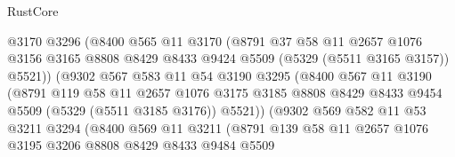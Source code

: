 \begin{lexlean}{RustCore}
\begin{coremodule}
                          @3170
                          @3296
                          (@8400
                            @565
                            @11
                            @3170
                            (@8791
                              @37
                              @58
                              @11
                              @2657
                              @1076
                              @3156
                              @3165
                              @8808
                              @8429
                              @8433
                              @9424
                              @5509
                              (@5329 (@5511 @3165 @3157))
                              @5521))
                          (@9302
                            @567
                            @583
                            @11
                            @54
                            @3190
                            @3295
                            (@8400
                              @567
                              @11
                              @3190
                              (@8791
                                @119
                                @58
                                @11
                                @2657
                                @1076
                                @3175
                                @3185
                                @8808
                                @8429
                                @8433
                                @9454
                                @5509
                                (@5329 (@5511 @3185 @3176))
                                @5521))
                            (@9302
                              @569
                              @582
                              @11
                              @53
                              @3211
                              @3294
                              (@8400
                                @569
                                @11
                                @3211
                                (@8791
                                  @139
                                  @58
                                  @11
                                  @2657
                                  @1076
                                  @3195
                                  @3206
                                  @8808
                                  @8429
                                  @8433
                                  @9484
                                  @5509

\end{coremodule}
\end{lexlean}
